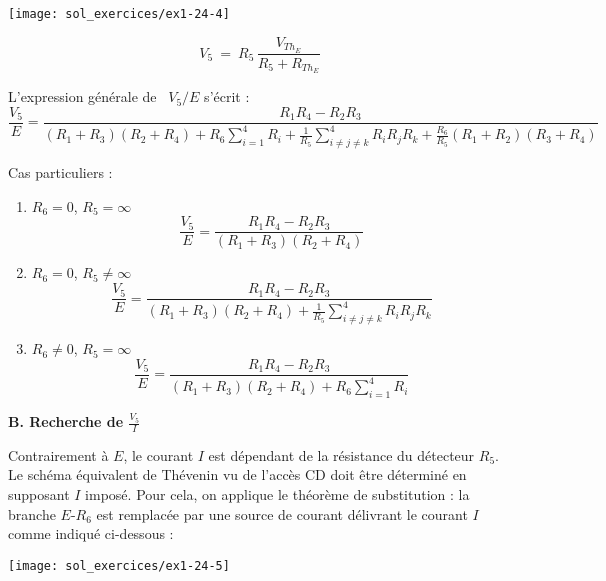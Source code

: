 \begin{enumerate}
\parbox[c]{5cm}{
\begin{center} \texttt{[image: sol\_exercices/ex1-24-4]} 
\end{center}} 
\parbox[c]{5cm}{ \[ V_5 \:
= \: R_5 \, \frac{V_{Th_E}}{R_5 + R_{Th_E}} \]}

L'expression générale de \ $V_5/E$ s'écrit : 
\[\frac{V_5}{E}=\frac{R_1R_4-R_2R_3}
{(R_1+R_3)(R_2+R_4)+R_6\sum_{i=1}^4R_i+\frac{1}{R_5}\sum_{i\neq j\neq k}^4R_iR_jR_k
+\frac{R_6}{R_5}(R_1+R_2)(R_3+R_4)}\]

Cas particuliers : 
\begin{enumerate}
\item $R_6=0$, $R_5=\infty$
\[\frac{V_5}{E}=\frac{R_1R_4-R_2R_3}{(R_1+R_3)(R_2+R_4)}\] 
\item $R_6=0$, $R_5\neq \infty$
\[\frac{V_5}{E}=\frac{R_1R_4-R_2R_3}{(R_1+R_3)(R_2+R_4)+\frac{1}{R_5}\sum_{i\neq j\neq
		k}^4R_iR_jR_k}\] 
\item $R_6\neq 0$, $R_5= \infty$
\[\frac{V_5}{E}=\frac{R_1R_4-R_2R_3}{(R_1+R_3)(R_2+R_4)+R_6\sum_{i=1}^4R_i}\]
\end{enumerate}
\end{enumerate}
{\bf B. Recherche de  $\frac{V_5}{I}$}

Contrairement à $E$, le courant $I$ est dépendant de la résistance du détecteur $R_5$. Le
schéma équivalent de Thévenin vu de l'accès CD doit être déterminé en supposant $I$ imposé. Pour cela, on applique le théorème de substitution : la branche $E$-$R_6$ est remplacée par une source de courant délivrant le courant $I$ comme indiqué ci-dessous :
\begin{center} 
\texttt{[image: sol\_exercices/ex1-24-5]}
\end{center} 

